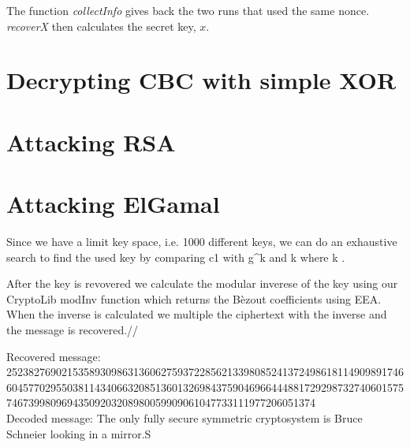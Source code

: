 \documentclass{article}
\begin{document}
The function \textit{collectInfo} gives back the two runs that used the same
nonce. \textit{recoverX} then calculates the
secret key, $x$.

\section{Decrypting CBC with simple XOR}


\section{Attacking RSA}

\section{Attacking ElGamal}
Since we have a limit key space, i.e. 1000 different keys,  we can do an exhaustive search to find the used key by comparing c1 with g^k and k where k .

After the key is revovered we calculate the modular inverese of the key using our CryptoLib modInv function which returns the Bèzout coefficients using EEA.
When the inverse is calculated we multiple the ciphertext with the inverse and the message is recovered.//

Recovered message: 25238276902153589309863136062759372285621339808524137249861811490989174660457702955038114340663208513601326984375904696644488172929873274060157574673998096943509203208980059909061047733111977206051374 \\
Decoded message: The only fully secure symmetric cryptosystem is Bruce Schneier looking in a mirror.S
\end{document}
